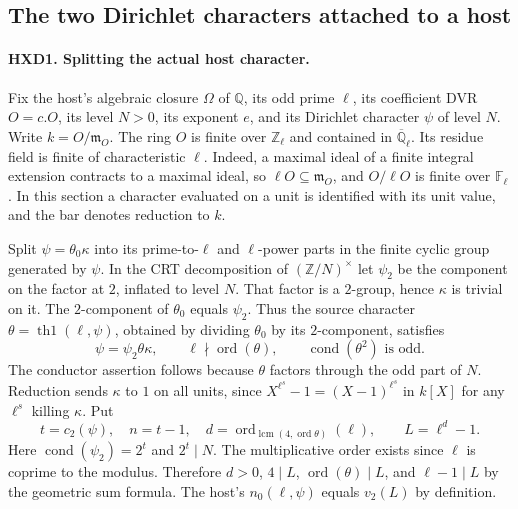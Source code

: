 \subsection{The two Dirichlet characters attached to a host}
\label{sec:host-xpp-character-input}

\paragraph{HXD1. Splitting the actual host character.}
Fix the host's algebraic closure $\Omega$ of $\mathbb Q$, its odd
prime $\ell$, its coefficient DVR $O=c.O$, its level $N>0$, its
exponent $e$, and its Dirichlet character $\psi$ of level $N$.
Write $k=O/\mathfrak m_O$. The ring $O$ is finite over
$\mathbb Z_\ell$ and contained in $\overline{\mathbb Q}_\ell$.
Its residue field is finite of characteristic $\ell$. Indeed, a
maximal ideal of a finite integral extension contracts to a maximal
ideal, so $\ell O\subseteq\mathfrak m_O$, and $O/\ell O$ is finite
over $\mathbb F_\ell$. In this section a character evaluated on a
unit is identified with its unit value, and the bar denotes reduction
to $k$.

Split $\psi=\theta_0\kappa$ into its prime-to-$\ell$ and
$\ell$-power parts in the finite cyclic group generated by $\psi$.
In the CRT decomposition of $(\mathbb Z/N)^\times$ let $\psi_2$ be
the component on the factor at $2$, inflated to level $N$. That factor
is a $2$-group, hence $\kappa$ is trivial on it. The $2$-component
of $\theta_0$ equals $\psi_2$. Thus the source character
$\theta=\operatorname{th1}(\ell,\psi)$, obtained by dividing
$\theta_0$ by its $2$-component, satisfies
\[
     \psi=\psi_2\theta\kappa,\qquad
     \ell\nmid\operatorname{ord}(\theta),\qquad
     \operatorname{cond}(\theta^2)\text{ is odd}.
\]
The conductor assertion follows because $\theta$ factors through the
odd part of $N$. Reduction sends $\kappa$ to $1$ on all units, since
$X^{\ell^s}-1=(X-1)^{\ell^s}$ in $k[X]$ for any $\ell^s$ killing
$\kappa$. Put
\[
 t=c_2(\psi),\quad n=t-1,\quad
 d=\operatorname{ord}_{\operatorname{lcm}(4,\operatorname{ord}\theta)}(\ell),
 \qquad L=\ell^d-1.
\]
Here $\operatorname{cond}(\psi_2)=2^t$ and $2^t\mid N$.
The multiplicative order exists since $\ell$ is coprime to the
modulus. Therefore $d>0$, $4\mid L$, $\operatorname{ord}(\theta)\mid L$,
and $\ell-1\mid L$ by the geometric sum formula.
The host's $n_0(\ell,\psi)$ equals $v_2(L)$ by definition.

